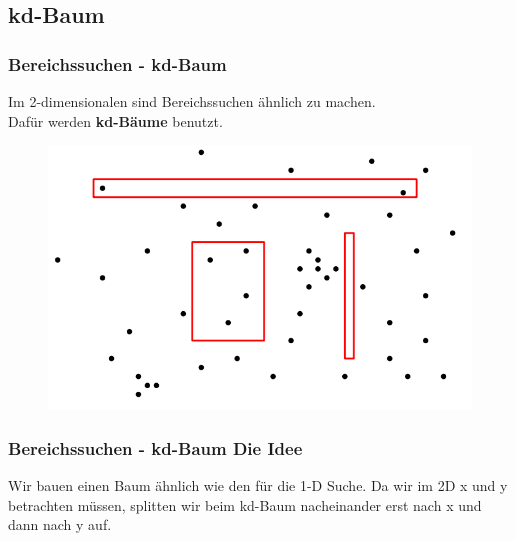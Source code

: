 \subsection{kd-Baum}
\begin{frame}
	\frametitle{Bereichssuchen - kd-Baum}
	Im 2-dimensionalen sind Bereichssuchen ähnlich zu machen. \\
	Dafür werden \textbf{kd-Bäume} benutzt.
	\begin{figure}[htbp]
	\begin{center}
  	\includegraphics[width=.8\linewidth]{bilder/2d.png}
	\end{center}
\end{figure}
\end{frame}

\begin{frame}
	\frametitle{Bereichssuchen - kd-Baum Die Idee}
	Wir bauen einen Baum ähnlich wie den für die 1-D Suche. Da wir im 2D x und y betrachten müssen, splitten wir beim kd-Baum nacheinander erst nach x und dann nach y auf.
\end{frame}

